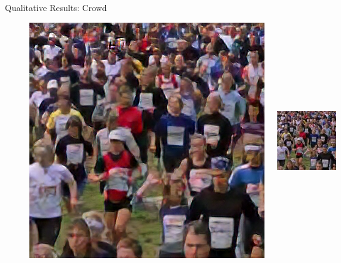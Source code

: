 \documentclass{beamer}
\begin{document}
\begin{frame}{Qualitative Results: Crowd}
\begin{figure}
  \begin{columns}
      \includegraphics[width=0.6\linewidth]{static/crowd_srunet.png}
      \includegraphics[width=0.15\linewidth]{static/crowd_compressed.png}
  \end{columns}

  \vspace{0.5cm} %


\end{figure}
\end{frame}
\end{document}
